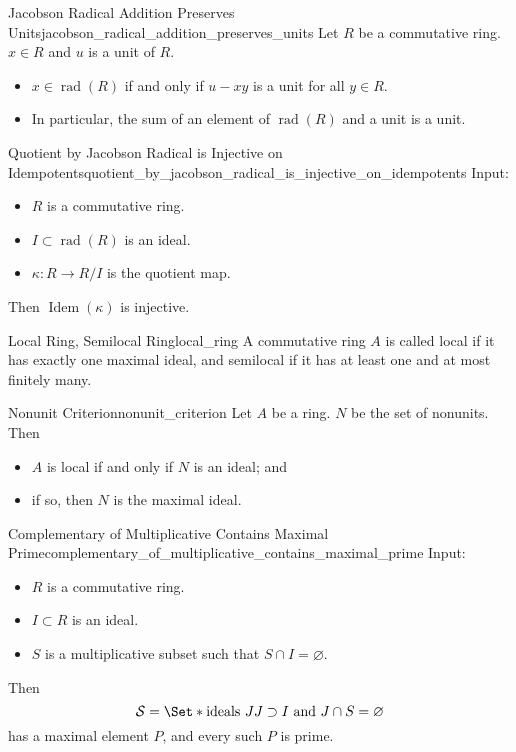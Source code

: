 \documentclass{article}
\begin{document}
\begin{proposition}{Jacobson Radical Addition Preserves Units}{jacobson_radical_addition_preserves_units}
    Let $R$ be a commutative ring.
    $x\in R$ and $u$ is a unit of $R$.
    \begin{itemize}
        \item $x\in\operatorname{rad}(R)$ if and only if $u - xy$ is a unit for all $y\in R$.
        \item In particular, the sum of an element of $\operatorname{rad}(R)$ and a unit is a unit.
    \end{itemize}
\end{proposition}

\begin{proposition}{Quotient by Jacobson Radical is Injective on Idempotents}{quotient_by_jacobson_radical_is_injective_on_idempotents}
    Input:
    \begin{itemize}
        \item $R$ is a commutative ring.
        \item $I\subset \operatorname{rad}(R)$ is an ideal.
        \item $\kappa: R\rightarrow R/I$ is the quotient map.
    \end{itemize}
    Then $\operatorname{Idem}(\kappa)$ is injective.
\end{proposition}

\begin{definition}{Local Ring, Semilocal Ring}{local_ring}
    A commutative ring $A$ is called local if it has exactly one maximal ideal, and semilocal if it has at least one and at most finitely many.
\end{definition}

\begin{lemma}{Nonunit Criterion}{nonunit_criterion}
    Let $A$ be a ring.
    $N$ be the set of nonunits.
    Then
    \begin{itemize}
        \item $A$ is local if and only if $N$ is an ideal; and
        \item if so, then $N$ is the maximal ideal.
    \end{itemize}
\end{lemma}

\begin{proposition}{Complementary of Multiplicative Contains Maximal Prime}{complementary_of_multiplicative_contains_maximal_prime}
    Input:
    \begin{itemize}
        \item $R$ is a commutative ring.
        \item $I\subset R$ is an ideal.
        \item $S$ is a multiplicative subset such that $S\cap I = \varnothing$.
    \end{itemize}
    Then
    \[ \mathcal{S} = \Set*{\text{ideals } J}{J\supset I \text{ and } J\cap S = \varnothing} \]
    has a maximal element $P$, and every such $P$ is prime.
\end{proposition}
\end{document}
